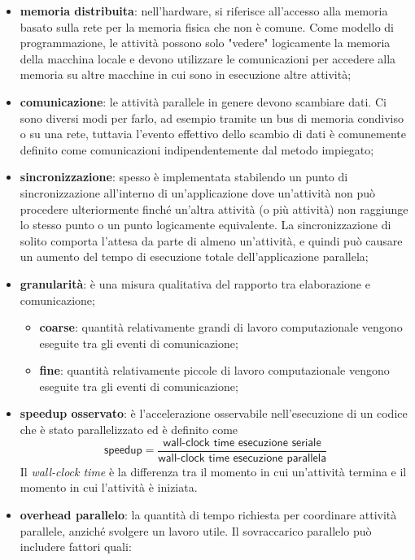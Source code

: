 \begin{itemize}
	\item \textbf{memoria distribuita}: nell'hardware, si riferisce all'accesso alla memoria basato sulla rete per la memoria fisica che non è comune. Come modello di programmazione, le attività possono solo "vedere" logicamente la memoria della macchina locale e devono utilizzare le comunicazioni per accedere alla memoria su altre macchine in cui sono in esecuzione altre attività;
	\item \textbf{comunicazione}: le attività parallele in genere devono
	scambiare dati. Ci sono diversi modi per farlo,
	ad esempio tramite un bus di memoria condiviso
	o su una rete, tuttavia l'evento effettivo dello
	scambio di dati è comunemente definito come comunicazioni
	indipendentemente dal metodo impiegato;
	\item \textbf{sincronizzazione}: spesso è implementata stabilendo un punto di sincronizzazione all'interno di un'applicazione dove un'attività non può procedere ulteriormente finché un'altra attività (o più attività) non raggiunge lo stesso punto o un punto logicamente equivalente. La sincronizzazione di solito comporta l'attesa da parte di almeno un'attività, e quindi può causare un aumento del tempo di esecuzione totale dell'applicazione parallela;
	\item \textbf{granularità}: è una
	misura qualitativa del rapporto tra elaborazione e
	comunicazione;
	\begin{itemize}
		\item \textbf{coarse}: quantità relativamente grandi di lavoro computazionale vengono eseguite tra gli eventi di comunicazione;
		\item \textbf{fine}: quantità relativamente piccole di lavoro computazionale vengono eseguite tra gli eventi di comunicazione;
	\end{itemize}
	\item \textbf{speedup osservato}: è l'accelerazione osservabile nell'esecuzione di un codice che è stato parallelizzato ed è definito come
	\begin{equation*}
		\textsf{speedup}=\frac{\textsf{wall-clock time esecuzione seriale}}{\textsf{wall-clock time esecuzione parallela}}
	\end{equation*}
	Il \textit{wall-clock time} è la differenza tra il momento in cui un'attività termina e il momento in cui l'attività è iniziata.
	\item \textbf{overhead parallelo}: la quantità di tempo richiesta per
	coordinare attività parallele, anziché svolgere un lavoro
	utile. Il sovraccarico parallelo può includere fattori quali:

\end{itemize}
